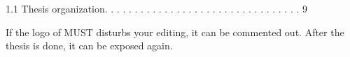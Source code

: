 1.1 Thesis organization. . . . . . . . . . . . . . . . . . . . . . . . . . . . . . . . . \hspace{0.2em}  9


\medskip\medskip\medskip\medskip

\begin{tcolorbox}[colframe=blue!75]
If the logo of MUST disturbs your editing, it can be commented out. After the thesis is done, it can be exposed again.
\end{tcolorbox}